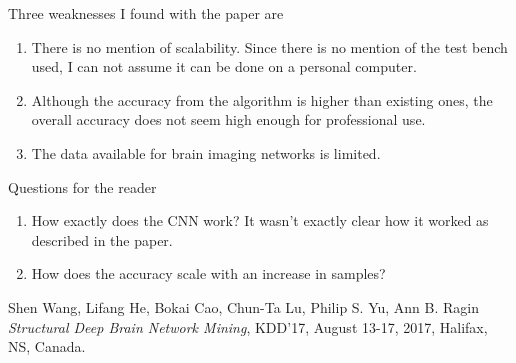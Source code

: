 \documentclass[12pt]{article}
\theoremstyle{remark}
\begin{document}
	Three weaknesses I found with the paper are
	\begin{enumerate}
		\item There is no mention of scalability. Since there is no mention of the test bench used, I can not assume it can be done on a personal computer. 
		\item Although the accuracy from the algorithm is higher than existing ones, the overall accuracy does not seem high enough for professional use. 
		\item The data available for brain imaging networks is limited.
	\end{enumerate}
	\vspace{0.5cm}
	
	Questions for the reader
	\begin{enumerate}
		\item How exactly does the CNN work? It wasn't exactly clear how it worked as described in the paper. 
		\item How does the accuracy scale with an increase in samples?
	\end{enumerate}
	\vspace{0.5cm}
	
	\begin{thebibliography}{unsrt}
		Shen Wang, Lifang He, Bokai Cao, Chun-Ta Lu, Philip S. Yu, Ann B. Ragin \emph{Structural Deep Brain Network Mining}, KDD’17, August 13-17, 2017, Halifax, NS, Canada.
	\end{thebibliography}
	
\end{document}
